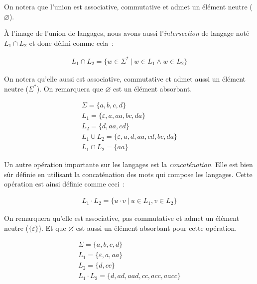 \noindent On notera que l'union est associative, commutative et admet un
élément neutre (\(\varnothing\)).

\vphantom{}

À l'image de l'union de langages, nous avons aussi l'\textit{intersection} de
langage noté \(L_1 \cap L_2\) et donc défini comme cela~:

\begin{gather}
    L_1 \cap L_2 = \{w \in \Sigma ^ * ~|~ w \in L_1 \land w \in L_2\}
\end{gather}

\noindent On notera qu'elle aussi est associative, commutative et admet
aussi un élément neutre (\(\Sigma ^ *\)). On remarquera que \(\varnothing\) est
un élément absorbant.

\begin{example}
    \begin{gather}
        \Sigma = \{a, b, c, d\} \\
        L_1 = \{\varepsilon, a, aa, bc, da\} \\
        L_2 = \{d, aa, cd\} \\
        L_1 \cup L_2 = \{\varepsilon, a, d, aa, cd, bc, da\} \\
        L_1 \cap L_2 = \{aa\}
    \end{gather}
\end{example}

Un autre opération importante sur les langages est la \textit{concaténation}.
Elle est bien sûr définie en utilisant la concaténation des mots qui compose
les langages. Cette opération est ainsi définie comme ceci~:

\begin{gather}
    L_1 \cdot L_2 = \{u \cdot v ~|~ u \in L_1, v \in L_2\}
\end{gather}

\noindent On remarquera qu'elle est associative, pas commutative et admet un
élément neutre (\(\{\varepsilon\}\)). Et que \(\varnothing\) est aussi un
élément absorbant pour cette opération.

\begin{example}
    \begin{gather}
        \Sigma = \{a, b, c, d\} \\
        L_1 = \{\varepsilon, a, aa\} \\
        L_2 = \{d, cc\} \\
        L_1 \cdot L_2 = \{d, ad, aad, cc, acc, aacc\}
    \end{gather}
\end{example}

